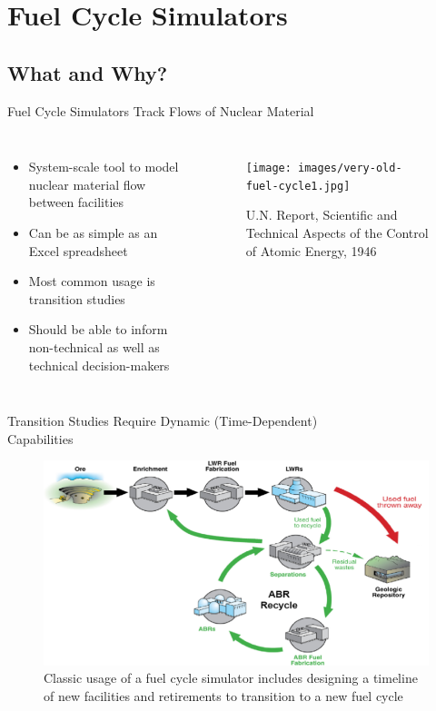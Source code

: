\section{Fuel Cycle Simulators}
\subsection{What and Why?}
\begin{frame}{Fuel Cycle Simulators Track Flows of Nuclear Material}
\begin{columns}
    \begin{itemize}
        \item System-scale tool to model nuclear material flow between facilities
        \item Can be as simple as an Excel spreadsheet
        \item Most common usage is transition studies
        \item Should be able to inform non-technical as well as technical decision-makers
    \end{itemize}
        \begin{figure}[h]
            \centering
            \texttt{[image: images/very-old-fuel-cycle1.jpg]}
            \caption{U.N. Report, Scientific and Technical Aspects of the Control of Atomic Energy, 1946 \cite{noauthor_scientific_1946}}
            \label{fig:old-fc-diagram}
        \end{figure}
\end{columns}
\end{frame}

\begin{frame}{Transition Studies Require Dynamic (Time-Dependent)\\Capabilities}
    \begin{figure}
        \centering
        \includegraphics[width=\linewidth]{images/Cyclus.png}
        \caption{Classic usage of a fuel cycle simulator includes designing a timeline of new facilities and retirements to transition to a new fuel cycle}
        \label{fig:ABR}
    \end{figure}
\end{frame}



